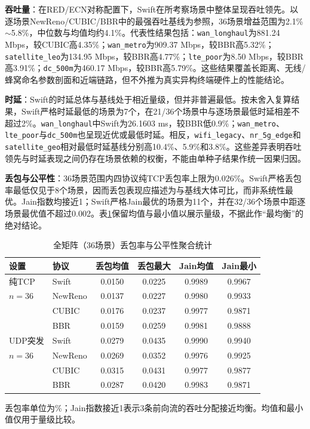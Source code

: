 \documentclass[10pt,twocolumn]{article}
\begin{document}
\textbf{吞吐量}：在RED/ECN对称配置下，Swift在所考察场景中整体呈现吞吐领先。以逐场景NewReno/CUBIC/BBR中的最强吞吐基线为参照，36场景增益范围为2.1\%$\sim$5.8\%，中位数与均值均约4.1\%。代表性结果包括：\texttt{wan\_longhaul}为881.24 Mbps，较CUBIC高4.35\%；\texttt{wan\_metro}为909.37 Mbps，较BBR高5.32\%；\texttt{satellite\_leo}为134.95 Mbps，较BBR高4.77\%；\texttt{lte\_poor}为8.50 Mbps，较BBR高3.91\%；\texttt{dc\_500m}为460.17 Mbps，较BBR高5.79\%。这些结果覆盖长距离、无线/蜂窝命名参数剖面和近端链路，但不外推为真实异构终端硬件上的性能结论。

\textbf{时延}：Swift的时延总体与基线处于相近量级，但并非普遍最低。按未舍入复算结果，Swift严格时延最低的场景为7个，在21/36个场景中与逐场景最低时延相差不超过2\%。\texttt{wan\_longhaul}中Swift为26.1603 ms，较BBR低0.9\%；\texttt{wan\_metro}、\texttt{lte\_poor}与\texttt{dc\_500m}也呈现近优或最低时延。相反，\texttt{wifi\_legacy}、\texttt{nr\_5g\_edge}和\texttt{satellite\_geo}相对最低时延基线分别高10.4\%、5.9\%和3.8\%。这些差异表明吞吐领先与时延表现之间仍存在场景依赖的权衡，不能由单种子结果作统一因果归因。

\textbf{丢包与公平性}：36场景范围内四协议纯TCP丢包率上限为0.026\%。Swift严格丢包率最低仅见于8个场景，因而丢包表现应描述为与基线大体可比，而非系统性最优。Jain指数均接近1；Swift严格Jain最优的场景为11个，并在32/36个场景中距逐场景最优值不超过0.002。表\ref{tab:agg}保留均值与最小值以展示量级，不据此作“最均衡”的绝对结论。

\begin{table}[htbp]
\centering
\caption{全矩阵（36场景）丢包率与公平性聚合统计}
\label{tab:agg}
\scriptsize
\setlength{\tabcolsep}{3pt}
\begin{tabular}{@{}llcccc@{}}
\toprule
\textbf{设置} & \textbf{协议} & \textbf{丢包均值} & \textbf{丢包最大} & \textbf{Jain均值} & \textbf{Jain最小} \\
\midrule
纯TCP & Swift    & 0.0150 & 0.0225 & 0.9989 & 0.9967 \\
$n=36$ & NewReno & 0.0137 & 0.0227 & 0.9980 & 0.9933 \\
      & CUBIC   & 0.0176 & 0.0237 & 0.9977 & 0.9871 \\
      & BBR     & 0.0159 & 0.0259 & 0.9981 & 0.9888 \\
\midrule
UDP突发 & Swift   & 0.0279 & 0.0435 & 0.9990 & 0.9940 \\
$n=36$ & NewReno & 0.0269 & 0.0352 & 0.9976 & 0.9925 \\
      & CUBIC   & 0.0315 & 0.0431 & 0.9977 & 0.9877 \\
      & BBR     & 0.0287 & 0.0420 & 0.9983 & 0.9871 \\
\bottomrule
\end{tabular}
\vspace{2pt}

\raggedright
\scriptsize 丢包率单位为\%；Jain指数接近1表示3条前向流的吞吐分配接近均衡。均值和最小值仅用于量级比较。
\end{table}
\end{document}
